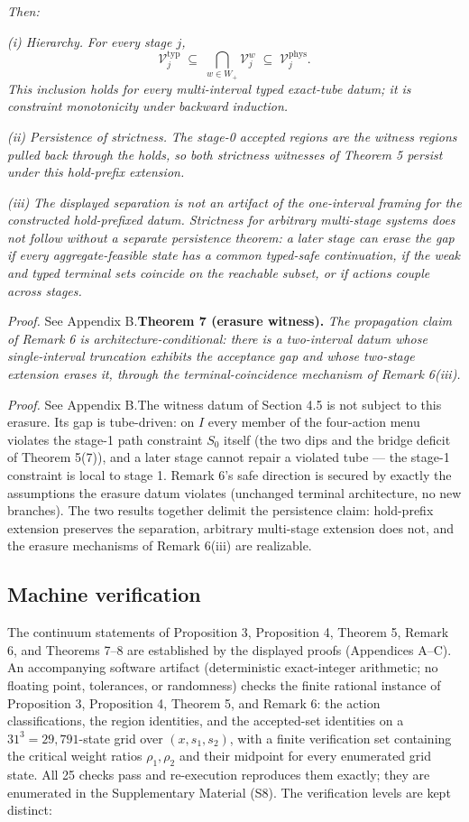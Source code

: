 \documentclass[review,11pt]{elsarticle}
\begin{document}
\emph{Then:}

\emph{(i) Hierarchy.} \emph{For every stage \(j\),}
\[\mathcal{V}^{\mathrm{typ}}_j \;\subseteq\; \bigcap_{w \in W_+} \mathcal{V}^{w}_j \;\subseteq\; \mathcal{V}^{\mathrm{phys}}_j.\]
\emph{This inclusion holds for every multi-interval typed exact-tube
datum; it is constraint monotonicity under backward induction.}

\emph{(ii) Persistence of strictness.} \emph{The stage-0 accepted
regions are the witness regions pulled back through the holds, so both
strictness witnesses of Theorem 5 persist under this hold-prefix
extension.}

\emph{(iii)} \emph{The displayed separation is not an artifact of the
one-interval framing for the constructed hold-prefixed datum. Strictness
for arbitrary multi-stage systems does not follow without a separate
persistence theorem: a later stage can erase the gap if every
aggregate-feasible state has a common typed-safe continuation, if the
weak and typed terminal sets coincide on the reachable subset, or if
actions couple across stages.}

\emph{Proof.} See Appendix B.\textbf{Theorem 7 (erasure witness).} \emph{The propagation claim of
Remark 6 is architecture-conditional: there is a two-interval datum
whose single-interval truncation exhibits the acceptance gap and whose
two-stage extension erases it, through the terminal-coincidence
mechanism of Remark 6(iii).}

\emph{Proof.} See Appendix B.The witness datum of Section 4.5 is not subject to this erasure. Its gap is
tube-driven: on \(I\) every member of the four-action menu violates the
stage-1 path constraint \(S_0\) itself (the two dips and the bridge
deficit of Theorem 5(7)), and a later stage cannot repair a violated
tube --- the stage-1 constraint is local to stage 1. Remark 6's safe
direction is secured by exactly the assumptions the erasure datum
violates (unchanged terminal architecture, no new branches). The two
results together delimit the persistence claim: hold-prefix extension
preserves the separation, arbitrary multi-stage extension does not, and
the erasure mechanisms of Remark 6(iii) are realizable.

\subsection{Machine verification}\label{machine-verification}

The continuum statements of Proposition 3, Proposition 4, Theorem 5,
Remark 6, and Theorems 7--8 are established by the displayed proofs (Appendices A--C). An accompanying software artifact (deterministic exact-integer arithmetic; no floating point, tolerances, or randomness) checks the finite rational instance of Proposition 3, Proposition 4, Theorem 5, and Remark 6: the action classifications, the region identities, and the accepted-set identities on a \(31^3 = 29{,}791\)-state grid over \((x, s_1, s_2)\), with a finite verification set containing the critical weight ratios \(\rho_1, \rho_2\) and their midpoint for every enumerated grid state. All 25 checks pass and re-execution reproduces them exactly; they are enumerated in the Supplementary Material (S8). The verification levels are kept distinct:
\end{document}
